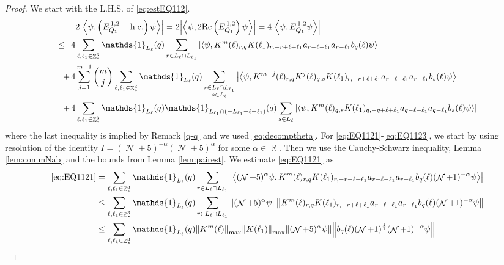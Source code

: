 \documentclass[sn-mathphys, Numbered ,a4paper]{sn-jnl}%
\DeclareMathOperator{\R}{\mathbb{R}}
\DeclareMathOperator{\Z}{\mathbb{Z}}
\DeclareMathOperator{\NN}{\mathcal{N}}
\newcommand{\half}{\frac{1}{2}}
\newcommand{\eva}[1]{\left\langle #1 \right\rangle}
\theoremstyle{plain}
\theoremstyle{definition}
\theoremstyle{remark}
\theoremstyle{plain}
\theoremstyle{definition}
\theoremstyle{remark}
\begin{document}
\begin{proof}
We start with the L.H.S. of \eqref{eq:estEQ112}.
\begin{align}
	&2\abs{\eva{\psi,\left(E^{\,1,2}_{Q_1}+\mathrm{h.c.}\right) \psi }} = 2\abs{\eva{\psi,2\mathrm{Re}\left(E^{\,1,2}_{Q_1}\right) \psi }} = 4\abs{\eva{\psi, E^{\,1,2}_{Q_1} \psi }}\nonumber\\
	\leq\,\;4& \sum\limits_{\ell, \ell_1\in \Z^3_*} \mathds{1}_{L_{\ell}}(q) \sum\limits_{r\in L_{\ell} \cap L_{\ell_1}} \abs{\eva{\psi, K^m(\ell )_{r,q} K(\ell_1)_{r,-r+\ell+\ell_1} a_{r-\ell-\ell_1} a_{r-\ell_1} b_{q}(\ell) \psi }}\label{eq:EQ1121}\\
	+\,4& \sum\limits_{j=1}^{m-1} {{m}\choose j} \sum\limits_{\ell, \ell_1\in \Z^3_*}\mathds{1}_{L_{\ell}}(q) \sum\limits_{\substack{r\in L_{\ell} \cap L_{\ell_1}\\ s \in L_{\ell}}}  \abs{\eva{\psi,  K^{m-j}(\ell)_{r,q} K^{j}(\ell)_{q,s}K(\ell_1)_{r,-r+\ell+\ell_1} a_{r-\ell-\ell_1} a_{r-\ell_1} b_{s}(\ell) \psi }}\label{eq:EQ1122}\\
	+\,4&\sum\limits_{\ell, \ell_1\in \Z^3_*} \mathds{1}_{L_{\ell}}(q) \mathds{1}_{L_{\ell_1}\cap(-L_{\ell_1}+\ell+\ell_1)}(q) \sum\limits_{s \in L_{\ell}} \abs{\eva{\psi, K^m(\ell)_{q,s} K(\ell_1)_{q,-q+\ell+\ell_1} a_{q-\ell-\ell_1} a_{q-\ell_1} b_{s}(\ell) \psi }}\label{eq:EQ1123}
\end{align}
where the last inequality is implied by Remark \ref{q-q} and we used \eqref{eq:decomptheta}.
For \eqref{eq:EQ1121}-\eqref{eq:EQ1123}, we start by using resolution of the identity $I = (\NN+5)^{-\alpha}(\NN+5)^{\alpha}$ for some $\alpha \in \R$. Then we use the Cauchy-Schwarz inequality, Lemma \ref{lem:commNab} and the bounds from Lemma \ref{lem:pairest}. 
We estimate \eqref{eq:EQ1121} as 
\begin{align}
	 \eqref{eq:EQ1121}
	 &=\sum\limits_{\ell, \ell_1\in \Z^3_*} \mathds{1}_{L_{\ell}}(q) \sum\limits_{r\in L_{\ell} \cap L_{\ell_1}} \abs{\eva{  (\NN+5)^{\alpha} \psi, K^m(\ell )_{r,q} K(\ell_1)_{r,-r+\ell+\ell_1} a_{r-\ell-\ell_1} a_{r-\ell_1} b_{q}(\ell)  (\NN+1)^{-\alpha} \psi }}\nonumber\\
	 &\leq \sum\limits_{\ell, \ell_1\in \Z^3_*} \mathds{1}_{L_{\ell}}(q) \sum\limits_{r\in L_{\ell} \cap L_{\ell_1}} \norm{  (\NN+5)^{\alpha} \psi} \norm{ K^m(\ell )_{r,q} K(\ell_1)_{r,-r+\ell+\ell_1} a_{r-\ell-\ell_1} a_{r-\ell_1} b_{q}(\ell) (\NN+1)^{-\alpha} \psi }\nonumber\\
	 &\leq \sum\limits_{\ell, \ell_1\in \Z^3_*} \mathds{1}_{L_{\ell}}(q)  \norm{K^m(\ell )}_{\mathrm{max}} \norm{K(\ell_1)}_{\mathrm{max}} \norm{  (\NN+5)^{\alpha} \psi} \norm{ b_{q}(\ell) (\NN+1)^\half (\NN+1)^{-\alpha} \psi }\nonumber

\end{align}
\end{proof}
\end{document}
